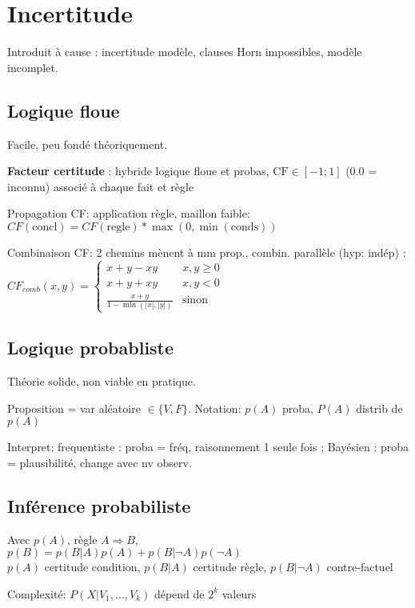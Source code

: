 
\section*{Incertitude}

Introduit à cause : incertitude modèle, clauses Horn impossibles, modèle incomplet.

\subsection*{Logique floue}

Facile, peu fondé théoriquement.

\textbf{Facteur certitude} : hybride logique floue et probas, $\text{CF} \in [-1; 1]$ (0.0 = inconnu) associé à chaque fait et règle

Propagation CF: application règle, maillon faible: $CF(\text{concl}) = CF(\text{regle}) * \max{(0, \min{(\text{conds})})}$

Combinaison CF: 2 chemins mènent à mm prop., combin. parallèle (hyp: indép) : 
$CF_{comb}(x,y) = 
\begin{cases}
x + y - xy & x, y \geq 0 \\
x + y + xy & x, y < 0 \\
\frac{x+y}{1-\min{(|x|, |y|)}} & \text{sinon}
\end{cases}$

\subsection*{Logique probabliste}

Théorie solide, non viable en pratique.

Proposition = var aléatoire $\in \{V, F\}$. Notation: $p(A)$ proba, $P(A)$ distrib de $p(A)$

Interpret: frequentiste :  proba = fréq, raisonnement 1 seule fois ; Bayésien : proba = plausibilité, change avec nv observ. 


\subsection*{Inférence probabiliste}
Avec $p(A)$, règle $A \Rightarrow B$, \\
$p(B) = p(B|A)p(A) + p(B|\lnot A) p(\lnot A)$ \\
$p(A)$ certitude condition, $p(B|A)$ certitude règle, $p(B|\lnot A)$ contre-factuel 

Complexité: $P(X|V_1, \dots, V_k)$ dépend de $2^k$ valeurs

